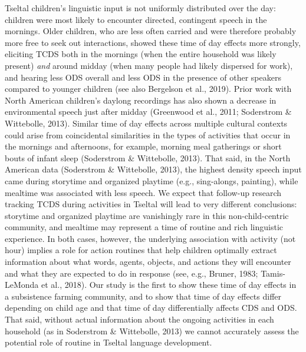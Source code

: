 \documentclass[floatsintext,man]{apa6}
\theoremstyle{definition}
\theoremstyle{definition}
\theoremstyle{definition}
\theoremstyle{remark}
\begin{document}
Tseltal children's linguistic input is not uniformly distributed over
the day: children were most likely to encounter directed, contingent
speech in the mornings. Older children, who are less often carried and
were therefore probably more free to seek out interactions, showed these
time of day effects more strongly, eliciting TCDS both in the mornings
(when the entire household was likely present) \emph{and} around midday
(when many people had likely dispersed for work), and hearing less ODS
overall and less ODS in the presence of other speakers compared to
younger children (see also Bergelson et al., 2019). Prior work with
North American children's daylong recordings has also shown a decrease
in environmental speech just after midday (Greenwood et al., 2011;
Soderstrom \& Wittebolle, 2013). Similar time of day effects across
multiple cultural contexts could arise from coincidental similarities in
the types of activities that occur in the mornings and afternoons, for
example, morning meal gatherings or short bouts of infant sleep
(Soderstrom \& Wittebolle, 2013). That said, in the North American data
(Soderstrom \& Wittebolle, 2013), the highest density speech input came
during storytime and organized playtime (e.g., sing-alongs, painting),
while mealtime was associated with less speech. We expect that follow-up
research tracking TCDS during activities in Tseltal will lead to very
different conclusions: storytime and organized playtime are vanishingly
rare in this non-child-centric community, and mealtime may represent a
time of routine and rich linguistic experience. In both cases, however,
the underlying association with activity (not hour) implies a role for
action routines that help children optimally extract information about
what words, agents, objects, and actions they will encounter and what
they are expected to do in response (see, e.g., Bruner, 1983;
Tamis-LeMonda et al., 2018). Our study is the first to show these time
of day effects in a subsistence farming community, and to show that time
of day effects differ depending on child age and that time of day
differentially affects CDS and ODS. That said, without actual
information about the ongoing activities in each household (as in
Soderstrom \& Wittebolle, 2013) we cannot accurately assess the
potential role of routine in Tseltal language development.
\end{document}
